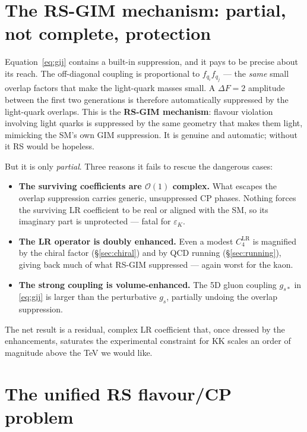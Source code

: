 \documentclass[11pt]{article}
\newcommand{\eps}{\varepsilon}
\newcommand{\gss}{g_{s*}}
\newcommand{\CLRfour}{C_4^{\mathrm{LR}}}
\theoremstyle{definition}
\begin{document}
\section{The RS-GIM mechanism: partial, not complete, protection}
\label{sec:rsgim}

Equation~\eqref{eq:gij} contains a built-in suppression, and it pays to be precise
about its reach. The off-diagonal coupling is proportional to $f_{q_i}f_{q_j}$ ---
the \emph{same} small overlap factors that make the light-quark masses small. A
$\Delta F=2$ amplitude between the first two generations is therefore
automatically suppressed by the light-quark overlaps. This is the \textbf{RS-GIM
mechanism}: flavour violation involving light quarks is suppressed by the same
geometry that makes them light, mimicking the SM's own GIM suppression. It is
genuine and automatic; without it RS would be hopeless.

But it is only \emph{partial}. Three reasons it fails to rescue the dangerous
cases:
\begin{itemize}[leftmargin=1.4em]
\item \textbf{The surviving coefficients are $\mathcal{O}(1)$ complex.} What
escapes the overlap suppression carries generic, unsuppressed CP phases. Nothing
forces the surviving LR coefficient to be real or aligned with the SM, so its
imaginary part is unprotected --- fatal for $\eps_K$.
\item \textbf{The LR operator is doubly enhanced.} Even a modest
$\CLRfour$ is magnified by the chiral factor (\S\ref{sec:chiral}) and by QCD
running (\S\ref{sec:running}), giving back much of what RS-GIM suppressed ---
again worst for the kaon.
\item \textbf{The strong coupling is volume-enhanced.} The 5D gluon coupling
$\gss$ in \eqref{eq:gij} is larger than the perturbative $g_s$, partially undoing
the overlap suppression.
\end{itemize}
The net result is a residual, complex LR coefficient that, once dressed by the
enhancements, saturates the experimental constraint for KK scales an order of
magnitude above the TeV we would like.

\section{The unified RS flavour/CP problem}
\label{sec:unified}
\end{document}
